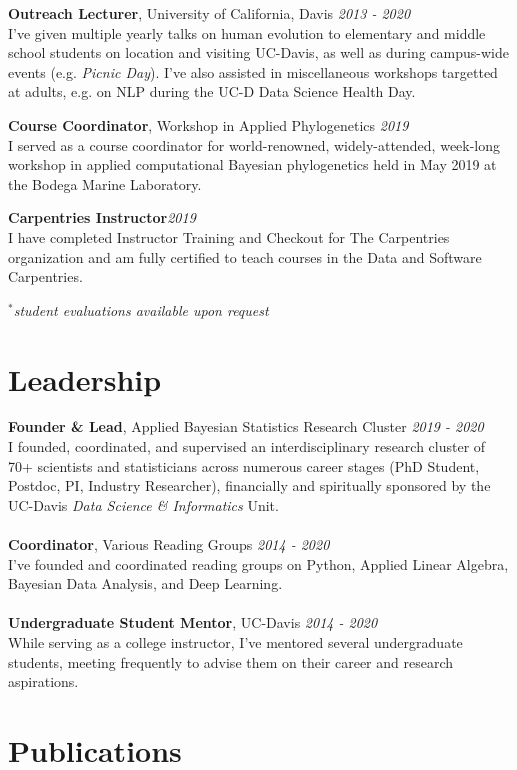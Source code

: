 \documentclass[12pt]{article}
\begin{document}
\textbf{Outreach Lecturer}, University of California, Davis \hfill \emph{2013  - 2020}\\
I've given multiple yearly talks on human evolution to elementary and middle school students on location and visiting UC-Davis, as well as during campus-wide events (e.g. \emph{Picnic Day}). I've also assisted in miscellaneous workshops targetted at adults, e.g. on NLP during the UC-D Data Science Health Day.

\textbf{Course Coordinator}, Workshop in Applied Phylogenetics \hfill \emph{2019}\\
I served as a course coordinator for world-renowned, widely-attended, week-long workshop in applied computational Bayesian phylogenetics held in May 2019 at the Bodega Marine Laboratory.

\textbf{Carpentries Instructor}\hfill \emph{2019}\\
I have completed Instructor Training and Checkout for The Carpentries organization and am fully certified to teach courses in the Data and Software Carpentries.

$^{*}$\emph{student evaluations available upon request}
\section{Leadership}

\textbf{Founder \& Lead}, Applied Bayesian Statistics Research Cluster \hfill \emph{2019 - 2020}\\
I founded, coordinated, and supervised an interdisciplinary research cluster of 70+ scientists and statisticians across numerous career stages (PhD Student, Postdoc, PI, Industry Researcher), financially and spiritually sponsored by the UC-Davis \emph{Data Science \& Informatics} Unit.\\\\
\textbf{Coordinator}, Various Reading Groups \hfill \emph{2014 - 2020}\\
I've founded and coordinated reading groups on Python, Applied Linear Algebra, Bayesian Data Analysis, and Deep Learning.\\\\
\textbf{Undergraduate Student Mentor}, UC-Davis \hfill \emph{2014 - 2020}\\
While serving as a college instructor, I've mentored several undergraduate students, meeting frequently to advise them on their career and research aspirations.

\section{Publications}
\end{document}
